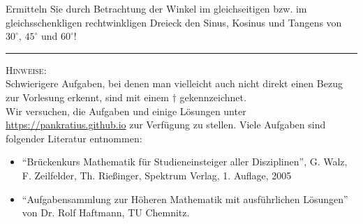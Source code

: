 \documentclass[11pt]{article}
\begin{document}
\begin{htask}
	Ermitteln Sie durch Betrachtung der Winkel im gleichseitigen bzw. im gleichsschenkligen rechtwinkligen Dreieck den Sinus, Kosinus und Tangens von $30^\circ$, $45^\circ$ und $60^\circ$!
\end{htask}
\hrule
\vspace{.5cm}
\noindent
\textsc{Hinweise:}\\
Schwierigere Aufgaben, bei denen man vielleicht auch nicht direkt einen Bezug zur Vorlesung erkennt, sind mit einem $\dagger$ gekennzeichnet.\\
Wir versuchen, die Aufgaben und einige Lösungen unter \url{https://pankratius.github.io} zur Verfügung zu stellen.
Viele Aufgaben sind folgender Literatur entnommen:
\begin{itemize}
	\item ``Br\"uckenkurs Mathematik f\"ur Studieneinsteiger aller Disziplinen'', G. Walz, F. Zeilfelder, Th. Rie\ss inger, Spektrum Verlag, 1. Auflage, 2005
	\item ``Aufgabensammlung zur H\"oheren Mathematik mit ausf\"uhrlichen L\"osungen'' von Dr. Rolf Haftmann, TU Chemnitz.
\end{itemize}
\end{document}
